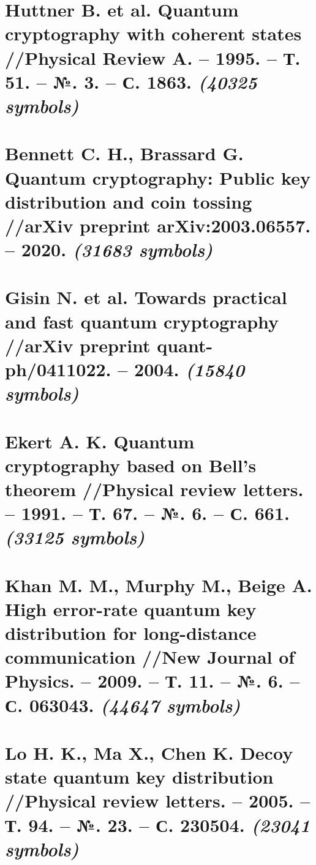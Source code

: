 

\newcommand{\trnas}{Translation}
\newcommand{\dic}{Dictionary}
\newcommand{\review}{Review}

\newcommand{\symcount}[1]{\textbf{\textit{(#1 symbols)}} }




\tableofcontents
\clearpage
\section{Huttner B. et al. Quantum cryptography with coherent states //Physical Review A. – 1995. – Т. 51. – №. 3. – С. 1863. \symcount{40325}}


\clearpage
\section{Bennett C. H., Brassard G. Quantum cryptography: Public key distribution and coin tossing //arXiv preprint arXiv:2003.06557. – 2020. \symcount{31683}}


\clearpage
\section{Gisin N. et al. Towards practical and fast quantum cryptography //arXiv preprint quant-ph/0411022. – 2004. \symcount{15840}}


\clearpage
\section{Ekert A. K. Quantum cryptography based on Bell’s theorem //Physical review letters. – 1991. – Т. 67. – №. 6. – С. 661. \symcount{33125}}


\clearpage
\section{Khan M. M., Murphy M., Beige A. High error-rate quantum key distribution for long-distance communication //New Journal of Physics. – 2009. – Т. 11. – №. 6. – С. 063043. \symcount{44647}}


\clearpage
\section{Lo H. K., Ma X., Chen K. Decoy state quantum key distribution //Physical review letters. – 2005. – Т. 94. – №. 23. – С. 230504. \symcount{23041}}


